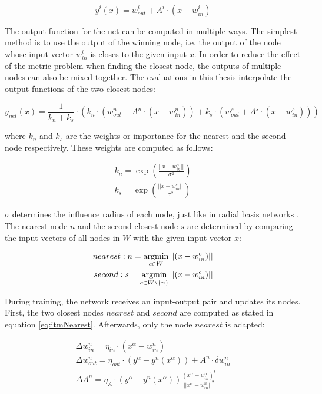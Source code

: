 \begin{equation}
y^i(x) = w^i_{out} + A^i \cdot (x-w^i_{in})
\label{eq:llmOut}
\end{equation}

The output function for the net can be computed in multiple ways. The simplest method is to use the output of the winning node, i.e. the output of the node whose input vector $w^i_{in}$ is closes to the given input $x$. In order to reduce the effect of the metric problem when finding the closest node, the outputs of multiple nodes can also be mixed together. The evaluations in this thesis interpolate the output functions of the two closest nodes:

\begin{equation}
y_{net}(x) =  \frac{1}{k_n+k_s} \cdot (k_n \cdot (w^n_{out} + A^n \cdot (x-w^n_{in})) + k_s \cdot  (w^s_{out} + A^s \cdot (x-w^s_{in})))
\end{equation}

where $k_n$ and $k_s$ are the weights or importance for the nearest and the second node respectively. These weights are computed as follows:

\begin{equation}
\begin{split}
k_n = \exp(\frac{||x-w^n_{in}||}{\sigma^2}) \\
k_s = \exp(\frac{||x-w^s_{in}||}{\sigma^2}) 
\end{split}
\end{equation}

$\sigma$ determines the influence radius of each node, just like in radial basis networks \cite{rbf}. The nearest node $n$ and the second closest node $s$ are determined by comparing the input vectors of all nodes in $W$ with the given input vector $x$:

\begin{equation}
\begin{split}
	nearest: n = \argmin_{c\in W} ||(x - w^c_{in})|| \\
	second: s = \argmin_{c\in W\backslash\{n\}} ||(x - w^c_{in})||
\end{split}
\label{eq:itmNearest}
\end{equation}

During training, the network receives an input-output pair and updates its nodes. First, the two closest nodes $nearest$ and $second$ are computed as stated in equation \ref{eq:itmNearest}. Afterwards, only the node $nearest$ is adapted:

\begin{equation}
\begin{split}
\Delta w^n_{in} = \eta_{in} \cdot (x^\alpha - w^n_{in}) \\
\Delta w^n_{out} = \eta_{out} \cdot (y^\alpha - y^n(x^\alpha)) + A^n \cdot \delta w^n_{in} \\
\Delta A^n = \eta_A \cdot (y^\alpha - y^n(x^\alpha)) \frac{(x^\alpha - w^n_{in})^t}{||x^\alpha - w^n_{in}||^2}
\end{split}
\end{equation}

